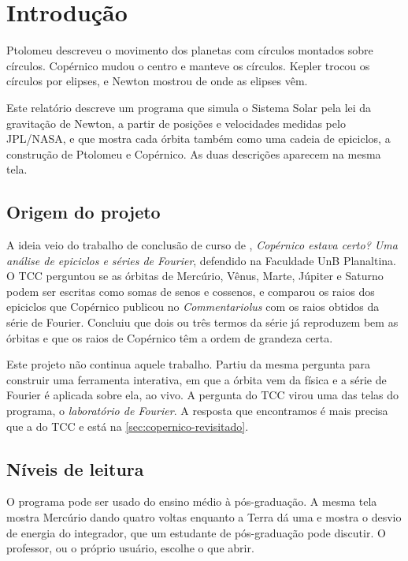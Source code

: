 \chapter{Introdução}\label{cap:introducao}

Ptolomeu descreveu o movimento dos planetas com círculos montados sobre círculos. Copérnico mudou o centro e manteve os círculos. Kepler trocou os círculos por elipses, e Newton mostrou de onde as elipses vêm.

Este relatório descreve um programa que simula o Sistema Solar pela lei da gravitação de Newton, a partir de posições e velocidades medidas pelo JPL/NASA, e que mostra cada órbita também como uma cadeia de epiciclos, a construção de Ptolomeu e Copérnico. As duas descrições aparecem na mesma tela.

\section{Origem do projeto}

A ideia veio do trabalho de conclusão de curso de , \emph{Copérnico estava certo? Uma análise de epiciclos e séries de Fourier}, defendido na Faculdade UnB Planaltina. O TCC perguntou se as órbitas de Mercúrio, Vênus, Marte, Júpiter e Saturno podem ser escritas como somas de senos e cossenos, e comparou os raios dos epiciclos que Copérnico publicou no \emph{Commentariolus} com os raios obtidos da série de Fourier. Concluiu que dois ou três termos da série já reproduzem bem as órbitas e que os raios de Copérnico têm a ordem de grandeza certa.

Este projeto não continua aquele trabalho. Partiu da mesma pergunta para construir uma ferramenta interativa, em que a órbita vem da física e a série de Fourier é aplicada sobre ela, ao vivo. A pergunta do TCC virou uma das telas do programa, o \emph{laboratório de Fourier}. A resposta que encontramos é mais precisa que a do TCC e está na \autoref{sec:copernico-revisitado}.

\section{Níveis de leitura}

O programa pode ser usado do ensino médio à pós-graduação. A mesma tela mostra Mercúrio dando quatro voltas enquanto a Terra dá uma e mostra o desvio de energia do integrador, que um estudante de pós-graduação pode discutir. O professor, ou o próprio usuário, escolhe o que abrir.

